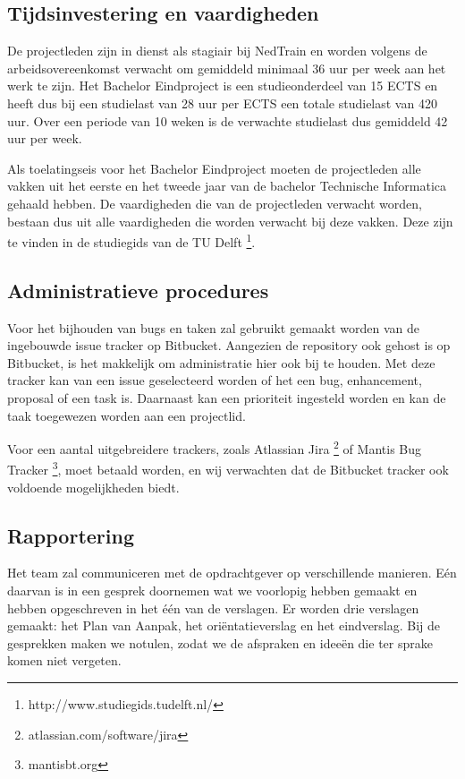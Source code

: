 \subsection{Tijdsinvestering en vaardigheden}
De projectleden zijn in dienst als stagiair bij NedTrain en worden volgens de arbeidsovereenkomst verwacht om gemiddeld minimaal 36 uur per week aan het werk te zijn. Het Bachelor Eindproject is een studieonderdeel van 15 ECTS en heeft dus bij een studielast van 28 uur per ECTS een totale studielast van 420 uur. Over een periode van 10 weken is de verwachte studielast dus gemiddeld 42 uur per week.

Als toelatingseis voor het Bachelor Eindproject moeten de projectleden alle vakken uit het eerste en het tweede jaar van de bachelor Technische Informatica gehaald hebben. De vaardigheden die van de projectleden verwacht worden, bestaan dus uit alle vaardigheden die worden verwacht bij deze vakken. Deze zijn te vinden in de studiegids van de TU Delft \footnote{http://www.studiegids.tudelft.nl/}.

\subsection{Administratieve procedures}
Voor het bijhouden van bugs en taken zal gebruikt gemaakt worden van de ingebouwde issue tracker op Bitbucket. Aangezien de repository ook gehost is op Bitbucket, is het makkelijk om administratie hier ook bij te houden. Met deze tracker kan van een issue geselecteerd worden of het een bug, enhancement, proposal of een task is. Daarnaast kan een prioriteit ingesteld worden en kan de taak toegewezen worden aan een projectlid.

Voor een aantal uitgebreidere trackers, zoals Atlassian Jira \footnote{atlassian.com/software/jira} of Mantis Bug Tracker \footnote{mantisbt.org}, moet betaald worden, en wij verwachten dat de Bitbucket tracker ook voldoende mogelijkheden biedt.

\subsection{Rapportering}
Het team zal communiceren met de opdrachtgever op verschillende manieren. E\'en daarvan is in een gesprek doornemen wat we voorlopig hebben gemaakt en hebben opgeschreven in het \'e\'en van de verslagen. Er worden drie verslagen gemaakt: het Plan van Aanpak, het ori\"entatieverslag en het eindverslag. Bij de gesprekken maken we notulen, zodat we de afspraken en idee\"en die ter sprake komen niet vergeten.

